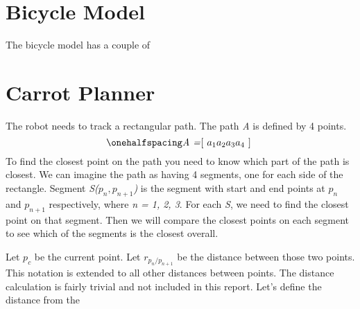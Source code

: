 \documentclass[12pt]{article}
\begin{document}


\newpage
\singlespacing
{}
\section{Bicycle Model}
\setlength{\parindent}{1cm}

The bicycle model has a couple of 



\newpage
\singlespacing
\section{Carrot Planner}
\setlength{\parindent}{1cm}

The robot needs to track a rectangular path. The path \textit{A} is defined by 4 points.
\begin{equation}
\onehalfspacing
\centering
\emph{A =\textnormal{\lbrack} $a_1 a_2 a_3 a_4$ \textnormal{\rbrack} }
\end{equation}
To find the closest point on the path you need to know which part of the path is closest. We can imagine the path as having 4 segments, one for each side of the rectangle. Segment \textit{S($p_n, p_{n+1}$)} is the segment with start and end points at \textit{$p_n$} and \textit{$p_{n+1}$} respectively, where \textit{n = 1, 2, 3}. For each \textit{S}, we need to find the closest point on that segment. Then we will compare the closest points on each segment to see which of the segments is the closest overall. 

Let \textit{$p_c$} be the current point. Let \textit{$r_{p_n/p_{n+1}}$} be the distance between those two points. This notation is extended to all other distances between points. The distance calculation is fairly trivial and not included in this report. Let's define the distance from the 
\end{document}
